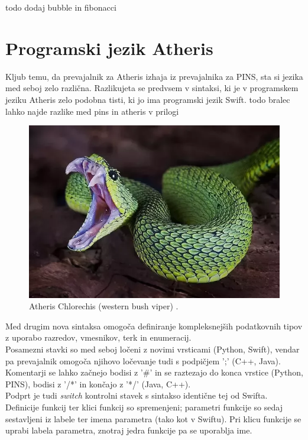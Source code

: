 \documentclass[a4paper, 12p]{book}
\begin{document}
todo dodaj bubble in fibonacci

\chapter{Programski jezik Atheris}
\label{ch1}

Kljub temu, da prevajalnik za Atheris izhaja iz prevajalnika za PINS, sta si jezika med seboj zelo različna. Razlikujeta se predvsem v sintaksi, ki je v programskem jeziku Atheris zelo podobna tisti, ki jo ima programski jezik Swift. todo bralec lahko najde razlike med pins in atheris v prilogi \\
\begin{figure}[h]
	\begin{center}
		\includegraphics[width=1\textwidth]{resources/atheris.png}
	\end{center}
	\caption{Atheris Chlorechis (western bush viper) \cite{Atheris}.}
	\label{image:ast}
\end{figure}

\indent Med drugim nova sintaksa omogoča definiranje kompleksnejših podatkovnih tipov z uporabo razredov, vmesnikov, terk in enumeracij. \\
\indent Posamezni stavki so med seboj ločeni z novimi vrsticami (Python, Swift), vendar pa prevajalnik omogoča njihovo ločevanje tudi s podpičjem ';' (C++, Java). \\
\indent Komentarji se lahko začnejo bodisi z '\#' in se raztezajo do konca vrstice (Python, PINS), bodisi z '/*' in končajo z '*/' (Java, C++). \\
\indent Podprt je tudi \textit{switch} kontrolni stavek s sintakso identične tej od Swifta.\\
\indent Definicije funkcij ter klici funkcij so spremenjeni; parametri funkcije so sedaj sestavljeni iz labele ter imena parametra (tako kot v Swiftu). Pri klicu funkcije se uprabi labela parametra, znotraj jedra funkcije pa se uporablja ime.
\end{document}
